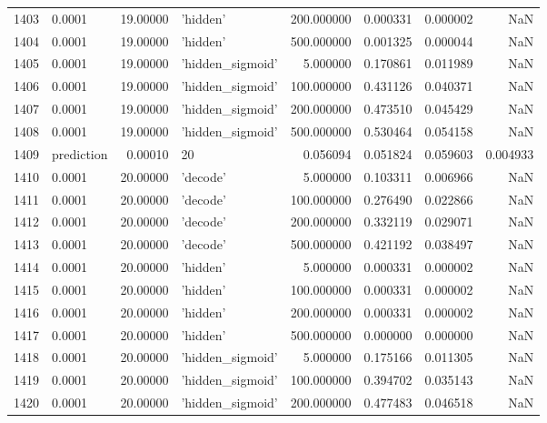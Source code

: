 \documentclass[10pt,a4paper]{article}
\begin{document}
\begin{tabular}{llrlrrrr}
1403 &      0.0001 &  19.00000 &           'hidden' &  200.000000 &  0.000331 &  0.000002 &       NaN \\
1404 &      0.0001 &  19.00000 &           'hidden' &  500.000000 &  0.001325 &  0.000044 &       NaN \\
1405 &      0.0001 &  19.00000 &   'hidden\_sigmoid' &    5.000000 &  0.170861 &  0.011989 &       NaN \\
1406 &      0.0001 &  19.00000 &   'hidden\_sigmoid' &  100.000000 &  0.431126 &  0.040371 &       NaN \\
1407 &      0.0001 &  19.00000 &   'hidden\_sigmoid' &  200.000000 &  0.473510 &  0.045429 &       NaN \\
1408 &      0.0001 &  19.00000 &   'hidden\_sigmoid' &  500.000000 &  0.530464 &  0.054158 &       NaN \\
1409 &  prediction &   0.00010 &                 20 &    0.056094 &  0.051824 &  0.059603 &  0.004933 \\
1410 &      0.0001 &  20.00000 &           'decode' &    5.000000 &  0.103311 &  0.006966 &       NaN \\
1411 &      0.0001 &  20.00000 &           'decode' &  100.000000 &  0.276490 &  0.022866 &       NaN \\
1412 &      0.0001 &  20.00000 &           'decode' &  200.000000 &  0.332119 &  0.029071 &       NaN \\
1413 &      0.0001 &  20.00000 &           'decode' &  500.000000 &  0.421192 &  0.038497 &       NaN \\
1414 &      0.0001 &  20.00000 &           'hidden' &    5.000000 &  0.000331 &  0.000002 &       NaN \\
1415 &      0.0001 &  20.00000 &           'hidden' &  100.000000 &  0.000331 &  0.000002 &       NaN \\
1416 &      0.0001 &  20.00000 &           'hidden' &  200.000000 &  0.000331 &  0.000002 &       NaN \\
1417 &      0.0001 &  20.00000 &           'hidden' &  500.000000 &  0.000000 &  0.000000 &       NaN \\
1418 &      0.0001 &  20.00000 &   'hidden\_sigmoid' &    5.000000 &  0.175166 &  0.011305 &       NaN \\
1419 &      0.0001 &  20.00000 &   'hidden\_sigmoid' &  100.000000 &  0.394702 &  0.035143 &       NaN \\
1420 &      0.0001 &  20.00000 &   'hidden\_sigmoid' &  200.000000 &  0.477483 &  0.046518 &       NaN \\

\end{tabular}
\end{document}
